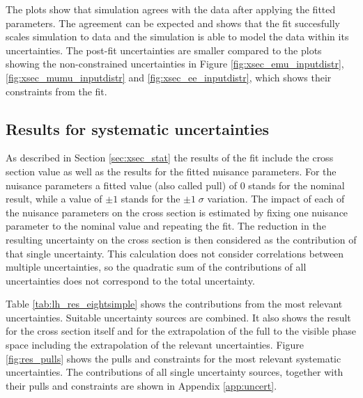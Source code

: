 The plots show that simulation agrees with the data after applying the fitted parameters.
The agreement can be expected and shows that the fit succesfully scales simulation to data and the
 simulation is able to model the data within its uncertainties.
The post-fit uncertainties are smaller compared to the plots showing the non-constrained uncertainties in Figure \ref{fig:xsec_emu_inputdistr},\ref{fig:xsec_mumu_inputdistr} and \ref{fig:xsec_ee_inputdistr}, which
shows their constraints from the fit.


\subsection{Results for systematic uncertainties}
\label{sec:results_uncert}

As described in Section \ref{sec:xsec_stat} the results of the fit include the \ttbar cross section value as well as the results for the fitted nuisance parameters.
For the nuisance parameters a fitted value (also called pull) of $0$ stands for the nominal result, while a value of $\pm 1$ stands for the $\pm 1 \; \sigma$ variation.
The impact of each of the nuisance parameters on the cross section is estimated by fixing one nuisance parameter to the nominal value and repeating the fit.
The reduction in the resulting uncertainty on the cross section is then considered as the contribution of that single uncertainty. This calculation does not consider correlations between multiple uncertainties,
so the quadratic sum of the contributions of all uncertainties does not correspond to the total uncertainty.

Table \ref{tab:lh_res_eightsimple} shows the contributions from the most relevant uncertainties. Suitable uncertainty sources are combined.
It also shows the result for the cross section itself and for the extrapolation of the full to the visible phase space including the extrapolation of the relevant uncertainties.
Figure \ref{fig:res_pulls} shows the pulls and constraints for the most relevant systematic uncertainties.
The contributions of all single uncertainty sources, together with their pulls and constraints are shown in Appendix \ref{app:uncert}.


